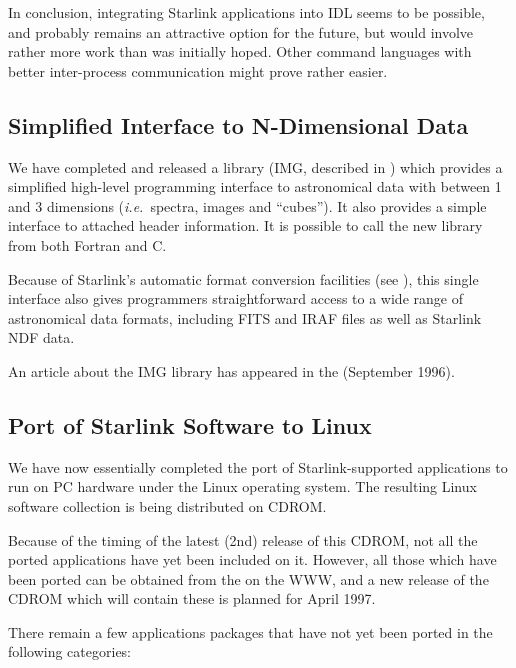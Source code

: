 In conclusion, integrating Starlink applications into IDL seems to be
possible, and probably remains an attractive option for the future,
but would involve rather more work than was initially hoped. Other
command languages with better inter-process communication might prove
rather easier.

\subsection{\label{infra:IMG}Simplified Interface to N-Dimensional Data}

We have completed and released a library (IMG, described in
) which provides a simplified high-level
programming interface to astronomical data with between 1 and 3
dimensions ({\em i.e.}\ spectra, images and ``cubes''). It also
provides a simple interface to attached header information. It is
possible to call the new library from both Fortran and C.

Because of Starlink's automatic format conversion facilities (see
), this single interface also gives
programmers straightforward access to a wide range of astronomical
data formats, including FITS and IRAF files as well as Starlink NDF
data.

An article about the IMG library has appeared in the
 (September
1996).

\subsection{Port of Starlink Software to Linux}

We have now essentially completed the port of Starlink-supported
applications to run on PC hardware under the Linux operating
system. The resulting Linux software collection is being distributed
on CDROM.

Because of the timing of the latest (2nd) release of this CDROM, not
all the ported applications have yet been included on it. However, all
those which have been ported can be obtained from the
 on the WWW, and a
new release of the CDROM which will contain these is planned for April
1997.

There remain a few applications packages that have not yet been ported
in the following categories:

